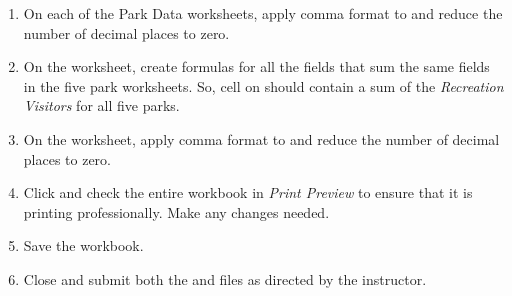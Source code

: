 \begin{enumbox}
	\begin{enumerate}
		\item On each of the Park Data worksheets, apply comma format to  and reduce the number of decimal places to zero.
		\item On the  worksheet, create formulas for all the fields that sum the same fields in the five park worksheets. So, cell  on  should contain a sum of the \textit{Recreation Visitors} for all five parks.
		\item On the  worksheet, apply comma format to  and reduce the number of decimal places to zero.
		\item Click  and check the entire workbook in \textit{Print Preview} to ensure that it is printing professionally. Make any changes needed.
		\item Save the  workbook.
		\item Close and submit both the  and  files as directed by the instructor.
	\end{enumerate}
\end{enumbox}